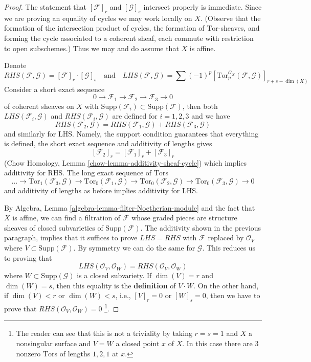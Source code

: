 \documentclass[10pt,a4paper]{amsart}
\theoremstyle{plain}
\theoremstyle{definition}
\theoremstyle{remark}
\numberwithin{equation}{subsection}
\begin{document}
\begin{proof}
The statement that $[\mathcal{F}]_r$ and $[\mathcal{G}]_s$ intersect properly
is immediate. Since we are proving an equality of cycles we may work
locally on $X$. (Observe that the formation of the intersection
product of cycles, the formation of $\text{Tor}$-sheaves, and
forming the cycle associated to a coherent sheaf, each commute with
restriction to open subschemes.) Thus we may and do assume that $X$ is affine.

\medskip\noindent
Denote
$$
RHS(\mathcal{F}, \mathcal{G}) = [\mathcal{F}]_r \cdot [\mathcal{G}]_s
\quad\text{and}\quad
LHS(\mathcal{F}, \mathcal{G}) = \sum (-1)^p
[\text{Tor}_p^{\mathcal{O}_X}(\mathcal{F}, \mathcal{G})]_{r + s - \dim(X)}
$$
Consider a short exact sequence
$$
0 \to \mathcal{F}_1 \to \mathcal{F}_2 \to \mathcal{F}_3 \to 0
$$
of coherent sheaves on $X$ with
$\text{Supp}(\mathcal{F}_i) \subset \text{Supp}(\mathcal{F})$,
then both $LHS(\mathcal{F}_i, \mathcal{G})$ and
$RHS(\mathcal{F}_i, \mathcal{G})$ are defined for $i = 1, 2, 3$
and we have
$$
RHS(\mathcal{F}_2, \mathcal{G}) =
RHS(\mathcal{F}_1, \mathcal{G}) + RHS(\mathcal{F}_3, \mathcal{G})
$$
and similarly for LHS. Namely, the support condition guarantees that
everything is defined, the short exact sequence and additivity of lengths
gives
$$
[\mathcal{F}_2]_r = [\mathcal{F}_1]_r  + [\mathcal{F}_3]_r
$$
(Chow Homology, Lemma \ref{chow-lemma-additivity-sheaf-cycle})
which implies additivity for RHS. The long exact sequence of $\text{Tor}$s
$$
\ldots \to \text{Tor}_1(\mathcal{F}_3, \mathcal{G}) \to
\text{Tor}_0(\mathcal{F}_1, \mathcal{G}) \to
\text{Tor}_0(\mathcal{F}_2, \mathcal{G}) \to
\text{Tor}_0(\mathcal{F}_3, \mathcal{G}) \to 0
$$
and additivity of lengths as before implies additivity for LHS.

\medskip\noindent
By Algebra, Lemma \ref{algebra-lemma-filter-Noetherian-module}
and the fact that $X$ is affine, we can find a filtration of $\mathcal{F}$
whose graded pieces are structure sheaves of closed subvarieties of
$\text{Supp}(\mathcal{F})$. The additivity shown in the previous paragraph,
implies that it suffices to prove $LHS = RHS$ with
$\mathcal{F}$ replaced by $\mathcal{O}_V$ where
$V \subset \text{Supp}(\mathcal{F})$.
By symmetry we can do the same for $\mathcal{G}$.
This reduces us to proving that
$$
LHS(\mathcal{O}_V, \mathcal{O}_W) = RHS(\mathcal{O}_V, \mathcal{O}_W)
$$
where $W \subset \text{Supp}(\mathcal{G})$ is a closed subvariety.
If $\dim(V) = r$ and $\dim(W) = s$, then this equality is the
{\bf definition} of $V \cdot W$. On the other hand, if
$\dim(V) < r$ or $\dim(W) < s$, i.e., $[V]_r = 0$ or $[W]_s = 0$,
then we have to prove that $RHS(\mathcal{O}_V, \mathcal{O}_W) = 0$
\footnote{The reader can see that this is not a triviality by
taking $r = s = 1$ and $X$ a nonsingular surface and $V = W$
a closed point $x$ of $X$. In this case there are $3$ nonzero
$\text{Tor}$s of lengths $1, 2, 1$ at $x$.}.


\end{proof}
\end{document}
